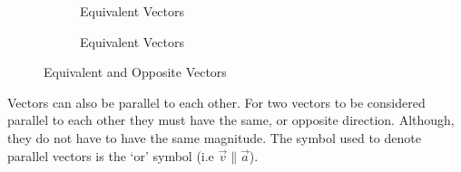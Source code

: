 \documentclass[12.5pt]{article}
\begin{document}
\begin{flushleft}
            \begin{figure}[h]
                \begin{mdframed}
                    \centering
                    \begin{subfigure}[b]{0.4\linewidth}
                        \centering
                        \caption{Equivalent Vectors}
                    \end{subfigure}
                    \centering
                    \begin{subfigure}[b]{0.4\linewidth}
                        \centering
                        \caption{Equivalent Vectors}
                    \end{subfigure}
                \caption{Equivalent and Opposite Vectors}
                \end{mdframed}
            \end{figure}

            \newpage

            Vectors can also be parallel to each other. For two vectors to be considered parallel to each other they must have the same, or opposite direction. 
            Although, they do not have to have the same magnitude. The symbol used to denote parallel vectors is the `or' symbol (i.e $\vec{v} \parallel \vec{a}$).


\end{flushleft}
\end{document}
